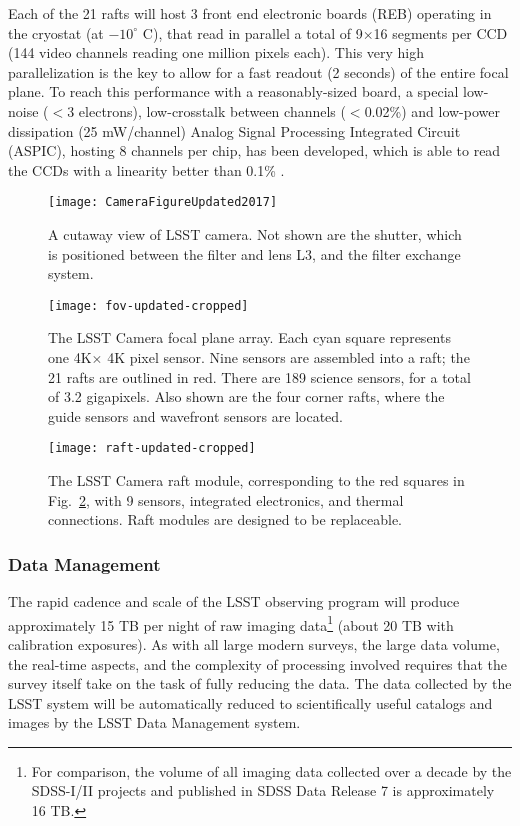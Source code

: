 Each of the 21 rafts will host 3 front end electronic boards (REB) operating in the cryostat
(at $-10^\circ$ C), that read in parallel a total of 9$\times$16 segments per CCD (144 video
channels reading one million pixels each). This very high parallelization is the key to allow
for a fast readout (2 seconds) of the entire focal plane. To reach this performance with a
reasonably-sized board, a special low-noise ($<$3 electrons), low-crosstalk between channels
($<$0.02\%) and low-power dissipation (25 mW/channel) Analog Signal Processing Integrated
Circuit (ASPIC),  hosting 8 channels per chip, has been developed, which is able to read the
CCDs with a linearity better than 0.1\% \citep{1748-0221-12-03-C03017}.

\begin{figure}[t!]
\texttt{[image: CameraFigureUpdated2017]}
\caption{A cutaway view of LSST camera. Not shown are the shutter, which is positioned between the filter and lens L3, and the filter exchange system.}
\label{Fig:camera}
\end{figure}


\begin{figure}[ht]
\texttt{[image: fov-updated-cropped]}
\caption{The LSST Camera focal plane array. Each cyan square represents one
4K$\times$ 4K pixel sensor. Nine sensors are assembled into a
raft; the 21 rafts are outlined in red. There are 189 science sensors, for a total of 3.2 gigapixels. Also shown are the four corner rafts, where the guide sensors and wavefront sensors are located.}
\label{Fig:fov}
\end{figure}

\begin{figure}[ht]
\texttt{[image: raft-updated-cropped]}
\caption{The LSST Camera raft module, corresponding to the red squares
in Fig.~\ref{Fig:fov}, with 9 sensors, integrated electronics,
and thermal connections. Raft modules are designed to be replaceable.}
\label{Fig:raft}
\end{figure}


\subsubsection{ Data Management }
\label{sec:dm}

The rapid cadence and scale of the LSST observing program will produce
approximately 15 TB per night of raw imaging data\footnote{For
  comparison, the volume of all imaging data collected over a decade
  by the SDSS-I/II projects
  and published in SDSS Data Release 7 \citep{2009ApJS..182..543A} is
  approximately 16 TB.} (about 20 TB with calibration exposures). As with
all large modern surveys, the large data volume, the
real-time aspects, and the complexity of processing involved requires
that the survey itself take on the task of fully reducing the data.
The data collected by the LSST
system will be automatically reduced to scientifically useful catalogs
and images by the LSST Data Management
\citep[DM;][]{2015arXiv151207914J} system.
\\

